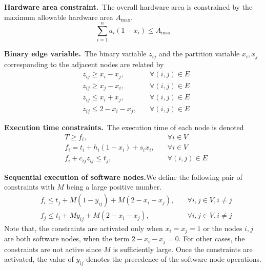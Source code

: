 \noindent\textbf{Hardware area constraint.}~The overall hardware area is constrained by the maximum allowable hardware area $A_{\textrm{max}}$.
\begin{equation}
    \sum_{i=1}^{n}a_i\left(1-x_i\right) \leq A_{\textrm{max}}
    \label{eq:hardware-area}
\end{equation}

\noindent\textbf{Binary edge variable.}~The binary variable $z_{ij}$ and the partition variable $x_i,x_j$ corresponding to the adjacent nodes are related by
\begin{subequations}
    \begin{align}
        &z_{ij} \geq x_i - x_j, \quad &\forall \left(i,j\right) \in E\\
        &z_{ij} \geq x_j - x_i, \quad &\forall \left(i,j\right) \in E\\
        &z_{ij} \leq x_i + x_j, \quad &\forall \left(i,j\right) \in E\\
        &z_{ij} \leq 2 - x_i - x_j, \quad &\forall \left(i,j\right) \in E
    \end{align}
    \label{eq:edge-selection}
\end{subequations}

\noindent\textbf{Execution time constraints.}~The execution time of each node is denoted 
\begin{subequations}
    \begin{align}
        & T \geq f_i, \quad &\forall i \in V\\
        & f_i = t_i + h_i\left(1-x_i\right) + s_ix_i, \quad &\forall i\in V\\
        & f_i + c_{ij}z_{ij} \leq t_j, \quad &\forall \left(i,j\right) \in E
    \end{align}
    \label{eq:exec-time}
\end{subequations}

\noindent\textbf{Sequential execution of software nodes.}We define the following pair of constraints with $M$ being a large positive number.
\begin{subequations}
    \begin{align}
        & f_i \leq t_j + M \left(1 - y_{ij}\right) + M \left(2 - x_i -x_j\right), \quad &\forall i,j \in V, i \neq j\\
        & f_j \leq t_i + M y_{ij} + M \left(2 - x_i -x_j\right), \quad &\forall i,j \in V, i \neq j
    \end{align}
    \label{eq:sw-seq}
\end{subequations}
Note that, the constraints are activated only when $x_i=x_j=1$ or the nodes $i,j$ are both software nodes, when the term $2-x_i-x_j=0$.
For other cases, the constraints are not active since $M$ is sufficiently large.
Once the constraints are activated, the value of $y_{ij}$ denotes the precedence of the software node operations.

